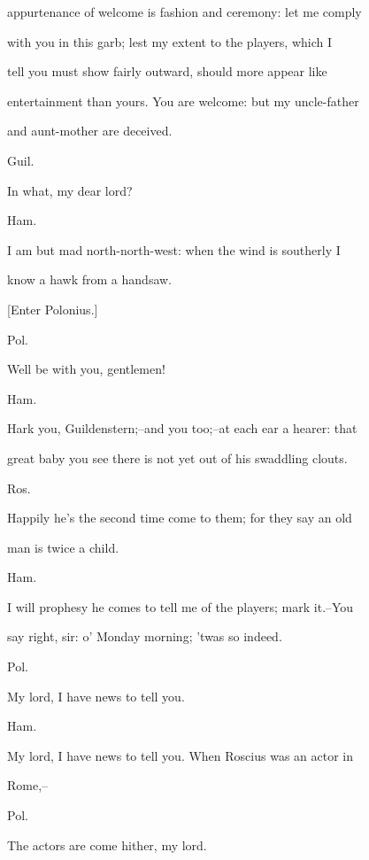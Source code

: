 \documentclass[12pt]{book}
\begin{document}
appurtenance of welcome is fashion and ceremony: let me comply

with you in this garb; lest my extent to the players, which I

tell you must show fairly outward, should more appear like

entertainment than yours. You are welcome: but my uncle-father

and aunt-mother are deceived.



Guil.

In what, my dear lord?



Ham.

I am but mad north-north-west: when the wind is southerly I

know a hawk from a handsaw.



[Enter Polonius.]



Pol.

Well be with you, gentlemen!



Ham.

Hark you, Guildenstern;--and you too;--at each ear a hearer: that

great baby you see there is not yet out of his swaddling clouts.



Ros.

Happily he's the second time come to them; for they say an old

man is twice a child.



Ham.

I will prophesy he comes to tell me of the players; mark it.--You

say right, sir: o' Monday morning; 'twas so indeed.



Pol.

My lord, I have news to tell you.



Ham.

My lord, I have news to tell you. When Roscius was an actor in

Rome,--



Pol.

The actors are come hither, my lord.
\end{document}
